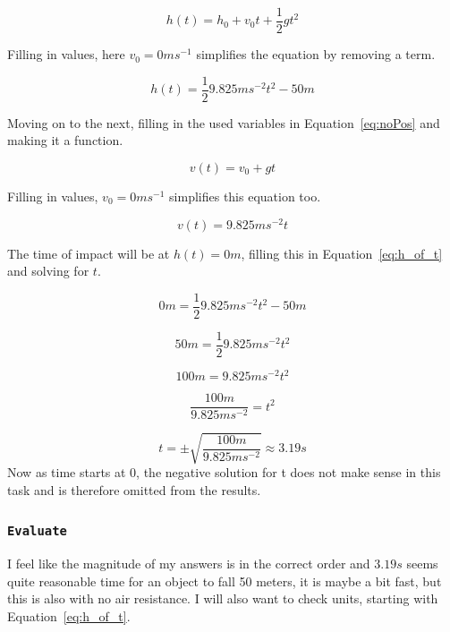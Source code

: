 \documentclass{article}
\let\oldsubsubsection\subsubsection
\renewcommand{\subsubsection}[1]{%
  \oldsubsubsection{\texttt{#1}}%
}
\begin{document}
\begin{equation*}
    h(t)=h_0 + v_0t + \frac{1}{2}gt^2
\end{equation*}

Filling in values, here \(v_0=0ms^{-1}\) simplifies the equation by removing a term.

\begin{equation}
    h(t) =\frac{1}{2}9.825ms^{-2}t^2-50m
    \label{eq:h_of_t}
\end{equation}

Moving on to the next, filling in the used variables in Equation~\ref{eq:noPos} and making it a function.

\begin{equation*}
    v(t) = v_0 + gt
\end{equation*}

Filling in values, \(v_0 = 0ms^{-1}\) simplifies this equation too.

\begin{equation}
    v(t) = 9.825ms^{-2}t
    \label{eq:v_of_t}
\end{equation}

\clearpage
The time of impact will be at \(h(t) = 0m\), filling this in Equation~\ref{eq:h_of_t} and solving for \(t\).

\begin{equation*}
    0m=\frac{1}{2}9.825ms^{-2}t^2-50m
\end{equation*}

\begin{equation*}
    50m = \frac{1}{2}9.825ms^{-2}t^{2}
\end{equation*}

\begin{equation*}
    100m = 9.825ms^{-2}t^{2}
\end{equation*}

\begin{equation*}
    \frac{100m}{9.825ms^{-2}} = t^{2}
\end{equation*}

\begin{equation}
    t = \pm \sqrt{\frac{100m}{9.825ms^{-2}}} \approx 3.19s
    \label{eq:t_impact}
\end{equation}
Now as time starts at 0, the negative solution for t does not make sense in this task and is therefore omitted from the results.

\subsubsection{Evaluate}
I feel like the magnitude of my answers is in the correct order and \(3.19s\) seems quite reasonable time for an object to fall 50 meters, it is maybe a bit fast, but this is also with no air resistance. I will also want to check units, starting with Equation~\ref{eq:h_of_t}.
\end{document}
